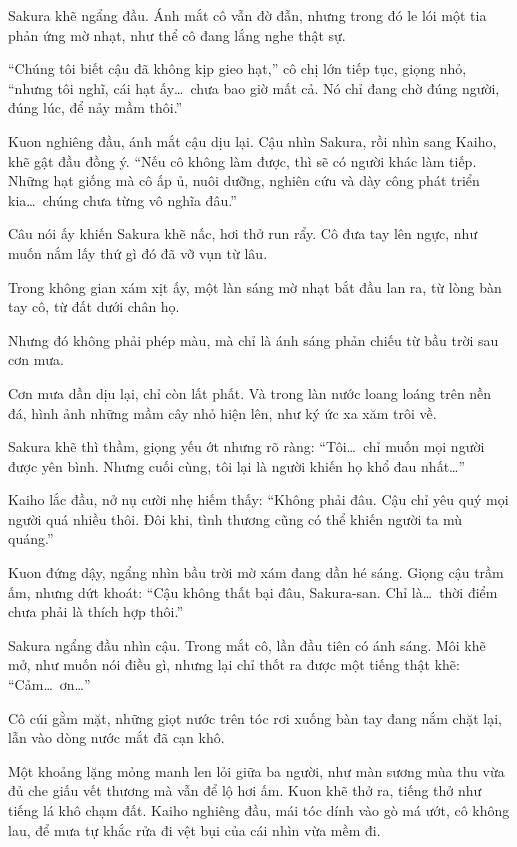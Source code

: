 \documentclass[../main.tex]{subfiles}
\begin{document}
Sakura khẽ ngẩng đầu. Ánh mắt cô vẫn đờ đẫn, nhưng trong đó le lói một tia phản ứng mờ nhạt, như thể cô đang lắng nghe thật sự.

``Chúng tôi biết cậu đã không kịp gieo hạt,'' cô chị lớn tiếp tục, giọng nhỏ, ``nhưng tôi nghĩ, cái hạt ấy\dots\ chưa bao giờ mất cả. Nó chỉ đang chờ đúng người, đúng lúc, để nảy mầm thôi.''

Kuon nghiêng đầu, ánh mắt cậu dịu lại. Cậu nhìn Sakura, rồi nhìn sang Kaiho, khẽ gật đầu đồng ý. ``Nếu cô không làm được, thì sẽ có người khác làm tiếp. Những hạt giống mà cô ấp ủ, nuôi dưỡng, nghiên cứu và dày công phát triển kia\dots\ chúng chưa từng vô nghĩa đâu.''

Câu nói ấy khiến Sakura khẽ nấc, hơi thở run rẩy. Cô đưa tay lên ngực, như muốn nắm lấy thứ gì đó đã vỡ vụn từ lâu.

Trong không gian xám xịt ấy, một làn sáng mờ nhạt bắt đầu lan ra, từ lòng bàn tay cô, từ đất dưới chân họ.

Nhưng đó không phải phép màu, mà chỉ là ánh sáng phản chiếu từ bầu trời sau cơn mưa.

Cơn mưa dần dịu lại, chỉ còn lất phất. Và trong làn nước loang loáng trên nền đá, hình ảnh những mầm cây nhỏ hiện lên, như ký ức xa xăm trôi về.

Sakura khẽ thì thầm, giọng yếu ớt nhưng rõ ràng: ``Tôi\dots\ chỉ muốn mọi người được yên bình. Nhưng cuối cùng, tôi lại là người khiến họ khổ đau nhất\dots''

Kaiho lắc đầu, nở nụ cười nhẹ hiếm thấy: ``Không phải đâu. Cậu chỉ yêu quý mọi người quá nhiều thôi. Đôi khi, tình thương cũng có thể khiến người ta mù quáng.''

Kuon đứng dậy, ngẩng nhìn bầu trời mờ xám đang dần hé sáng. Giọng cậu trầm ấm, nhưng dứt khoát: ``Cậu không thất bại đâu, Sakura-san.
Chỉ là\dots\ thời điểm chưa phải là thích hợp thôi.''

Sakura ngẩng đầu nhìn cậu. Trong mắt cô, lần đầu tiên có ánh sáng. Môi khẽ mở, như muốn nói điều gì, nhưng lại chỉ thốt ra được một tiếng thật khẽ: ``Cảm\dots\ ơn\dots''

Cô cúi gằm mặt, những giọt nước trên tóc rơi xuống bàn tay đang nắm chặt lại, lẫn vào dòng nước mắt đã cạn khô.

Một khoảng lặng mỏng manh len lỏi giữa ba người, như màn sương mùa thu vừa đủ che giấu vết thương mà vẫn để lộ hơi ấm. Kuon khẽ thở ra, tiếng thở như tiếng lá khô chạm đất. Kaiho nghiêng đầu, mái tóc dính vào gò má ướt, cô không lau, để mưa tự khắc rửa đi vệt bụi của cái nhìn vừa mềm đi.
\end{document}
